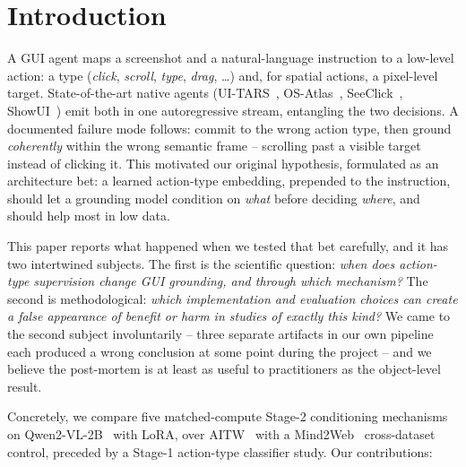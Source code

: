 \section{Introduction}

A GUI agent maps a screenshot and a natural-language instruction to a
low-level action: a type (\emph{click}, \emph{scroll}, \emph{type},
\emph{drag}, \ldots) and, for spatial actions, a pixel-level target.
State-of-the-art native agents (UI-TARS~\cite{uitars},
OS-Atlas~\cite{osatlas}, SeeClick~\cite{seeclick}, ShowUI~\cite{showui})
emit both in one autoregressive stream, entangling the two decisions. A
documented failure mode follows: commit to the wrong action type, then
ground \emph{coherently} within the wrong semantic frame -- scrolling past a
visible target instead of clicking it. This motivated our original
hypothesis, formulated as an architecture bet: a learned action-type
embedding, prepended to the instruction, should let a grounding model
condition on \emph{what} before deciding \emph{where}, and should help most
in low data.

This paper reports what happened when we tested that bet carefully, and it
has two intertwined subjects. The first is the scientific question:
\emph{when does action-type supervision change GUI grounding, and through
which mechanism?} The second is methodological: \emph{which implementation
and evaluation choices can create a false appearance of benefit or harm in
studies of exactly this kind?} We came to the second subject involuntarily
-- three separate artifacts in our own pipeline each produced a wrong
conclusion at some point during the project -- and we believe the
post-mortem is at least as useful to practitioners as the object-level
result.

Concretely, we compare five matched-compute Stage-2 conditioning mechanisms
on Qwen2-VL-2B~\cite{qwen2vl} with LoRA, over AITW~\cite{aitw} with a
Mind2Web~\cite{mind2web} cross-dataset control, preceded by a Stage-1
action-type classifier study. Our contributions:


